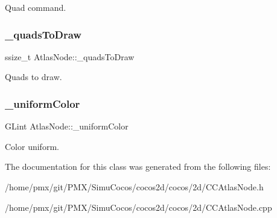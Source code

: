 Quad command. \mbox{\label{classAtlasNode_a64721363834e101ffadd9904b1b1a34f}} 
\subsubsection{\texorpdfstring{\+\_\+quads\+To\+Draw}{\_quadsToDraw}}
{\footnotesize\ttfamily ssize\+\_\+t Atlas\+Node\+::\+\_\+quads\+To\+Draw\hspace{0.3cm}{\ttfamily [protected]}}

Quads to draw. \mbox{\label{classAtlasNode_a33ef4d56cc8f62b17fa25d5385173e09}} 
\subsubsection{\texorpdfstring{\+\_\+uniform\+Color}{\_uniformColor}}
{\footnotesize\ttfamily G\+Lint Atlas\+Node\+::\+\_\+uniform\+Color\hspace{0.3cm}{\ttfamily [protected]}}

Color uniform. 

The documentation for this class was generated from the following files\+:\begin{DoxyCompactItemize}
\item 
/home/pmx/git/\+P\+M\+X/\+Simu\+Cocos/cocos2d/cocos/2d/C\+C\+Atlas\+Node.\+h\item 
/home/pmx/git/\+P\+M\+X/\+Simu\+Cocos/cocos2d/cocos/2d/C\+C\+Atlas\+Node.\+cpp\end{DoxyCompactItemize}

